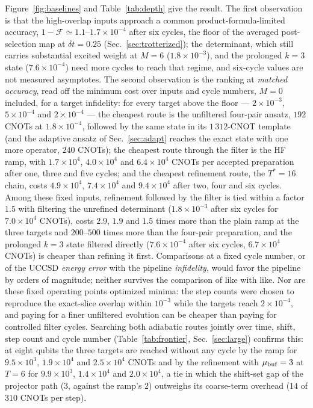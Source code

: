 \documentclass[
  aps,            %
  prc,            %
  reprint,        %
  superscriptaddress,
  floatfix,
  nofootinbib
]{revtex4-2}
\begin{document}
Figure~\ref{fig:baselines} and Table~\ref{tab:depth} give the result.  The
first observation is that the high-overlap inputs approach a common
product-formula-limited accuracy, $1-\mathcal F\simeq1.1$--$1.7\times10^{-4}$
after six cycles, the floor of the averaged post-selection map at
$\delta t=0.25$ (Sec.~\ref{sec:trotterized}); the determinant, which still
carries substantial excited weight at $M=6$ ($1.8\times10^{-3}$), and the
prolonged $k=3$ state ($7.6\times10^{-4}$) need more cycles to reach that
regime, and six-cycle values are not measured asymptotes.  The second
observation is the ranking at \emph{matched accuracy}, read off the minimum
cost over inputs and cycle numbers, $M=0$ included, for a target
infidelity: for every target above the floor --- $2\times10^{-3}$,
$5\times10^{-4}$ and $2\times10^{-4}$ --- the cheapest route is the
unfiltered four-pair ansatz, $192$ CNOTs at $1.8\times10^{-4}$, followed by
the same state in its $1\,312$-CNOT template (and the adaptive ansatz of
Sec.~\ref{sec:adapt} reaches the exact state with one more operator, $240$
CNOTs); the cheapest route through the
filter is the HF ramp, with $1.7\times10^{4}$, $4.0\times10^{4}$ and
$6.4\times10^{4}$ CNOTs per accepted preparation after one, three and five
cycles; and the cheapest refinement route, the $T^{*}=16$ chain, costs
$4.9\times10^{4}$, $7.4\times10^{4}$ and $9.4\times10^{4}$ after two, four
and six cycles.  Among these fixed inputs, refinement followed by the
filter is tied within a factor $1.5$ with filtering the unrefined
determinant ($1.8\times10^{-3}$ after six cycles for $7.0\times10^{4}$
CNOTs), costs $2.9$, $1.9$ and $1.5$ times more than the plain ramp at the
three targets and $200$--$500$ times more than the four-pair preparation,
and the prolonged $k=3$ state filtered directly ($7.6\times10^{-4}$ after
six cycles, $6.7\times10^{4}$ CNOTs) is cheaper than refining it first.
Comparisons at a fixed cycle number, or of the UCCSD \emph{energy error}
with the pipeline \emph{infidelity}, would favor the pipeline by orders of
magnitude; neither survives the comparison of like with like.  Nor are
these fixed operating points optimized minima: the step counts were chosen to reproduce the
exact-slice overlap within $10^{-3}$ while the targets reach
$2\times10^{-4}$, and paying for a finer unfiltered evolution can be
cheaper than paying for controlled filter cycles.  Searching both
adiabatic routes jointly over time, shift, step count and cycle number
(Table~\ref{tab:frontier}, Sec.~\ref{sec:large}) confirms this: at eight
qubits the three targets are reached without any cycle by the ramp for
$9.5\times10^{3}$, $1.9\times10^{4}$ and $2.5\times10^{4}$ CNOTs and by
the refinement with $\mu_{\rm buf}=3$ at $T=6$ for $9.9\times10^{3}$,
$1.4\times10^{4}$ and $2.0\times10^{4}$, a tie in which the shift-set gap
of the projector path ($3$, against the ramp's $2$) outweighs its
coarse-term overhead ($14$ of $310$ CNOTs per step).
\end{document}
